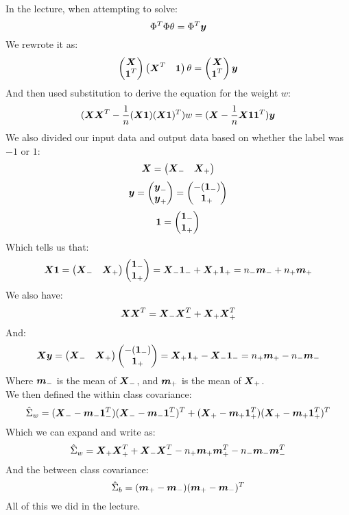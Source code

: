 \documentclass[12pt]{article}
\begin{document}
In the lecture, when attempting to solve:
\[ \Phi^T\Phi \theta = \Phi^T \bl{y} \]
We rewrote it as:
\[ \pmat{\bl{X} \\ \bl{1}^T}\pmat{\bl{X}^T & \bl{1}}
\theta = \pmat{\bl{X} \\ \bl{1}^T}\bl{y} \]
And then used substitution to derive
the equation for the weight $w$:
\[ (\bl{X}\bl{X}^T - \dfrac{1}{n}(\bl{X}\bl{1})(\bl{X}\bl{1})^T) w
= (\bl{X} - \dfrac{1}{n}\bl{X}\bl{1} \bl{1}^T) \bl{y} \]
We also divided our input data
and output data based on whether
the label was $-1$ or $1$:
\[ \bl{X} = \pmat{\bl{X}_- & \bl{X}_+} \]
\[ \bl{y} = \pmat{\bl{y}_- \\ \bl{y}_+}
= \pmat{-(\bl{1}_-) \\ \bl{1}_+} \]
\[ \bl{1} = \pmat{\bl{1}_- \\ \bl{1}_+} \]
Which tells us that:
\[ \bl{X}\bl{1} = \pmat{\bl{X}_- & \bl{X}_+}
\pmat{\bl{1}_- \\ \bl{1}_+} 
= \bl{X}_-\bl{1}_- + \bl{X}_+\bl{1}_+
= n_-\bl{m}_- + n_+\bl{m}_+ \]
We also have:
\[ \bl{X}\bl{X}^T = \bl{X}_-\bl{X}^T_- + \bl{X}_+\bl{X}^T_+ \]
And:
\[ \bl{X}\bl{y} = \pmat{\bl{X}_- & \bl{X}_+}
\pmat{-(\bl{1}_-) \\ \bl{1}_+} 
= \bl{X}_+\bl{1}_+ - \bl{X}_-\bl{1}_-
= n_+\bl{m}_+ - n_-\bl{m}_- \]
Where $\bl{m}_-$ is the mean of $\bl{X}_-$,
and $\bl{m}_+$ is the mean of $\bl{X}_+$. \\
We then defined the within class covariance:
\[ \hat{\Sigma}_w 
= (\bl{X}_- - \bl{m}_-\bl{1}^T_-)(\bl{X}_- 
- \bl{m}_-\bl{1}^T_-)^T
+ (\bl{X}_+ - \bl{m}_+\bl{1}^T_+)(\bl{X}_+ 
- \bl{m}_+\bl{1}^T_+)^T \]
Which we can expand and write as:
\[ \hat{\Sigma}_w = \bl{X}_+\bl{X}^T_+
+ \bl{X}_-\bl{X}^T_- -n_+\bl{m}_+\bl{m}^T_+
-n_-\bl{m}_-\bl{m}^T_- \]
And the between class covariance:
\[ \hat{\Sigma}_b = (\bl{m}_+ 
- \bl{m}_-)(\bl{m}_+ - \bl{m}_-)^T \]
All of this we did in the lecture. \\
\end{document}
